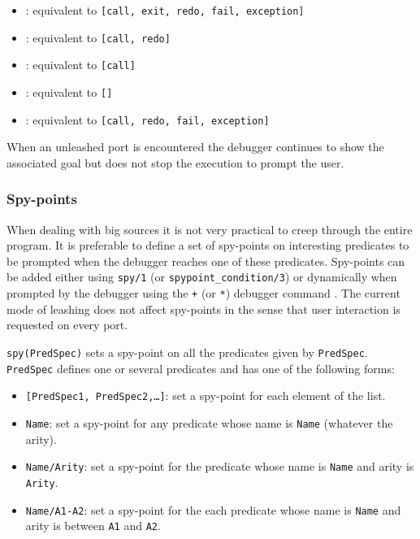 \begin{itemize}

\item {}: equivalent to \texttt{[call, exit, redo, fail,
exception]}

\item {}: equivalent to \texttt{[call, redo]}

\item {}: equivalent to \texttt{[call]}

\item {}: equivalent to \texttt{[]}

\item {}: equivalent to \texttt{[call, redo, fail,
exception]}

\end{itemize}

When an unleashed port is encountered the debugger continues to show the
associated goal but does not stop the execution to prompt the user.

\subsubsection{%
%
%
%
%
Spy-points \label{Spy-points}}

When dealing with big sources it is not very practical to creep through the
entire program. It is preferable to define a set of spy-points on
interesting predicates to be prompted when the debugger reaches one of these
predicates. Spy-points can be added either using \texttt{spy/1} (or
\texttt{spypoint\_condition/3}) or dynamically when prompted by the debugger
using the \texttt{+} (or \texttt{*}) debugger command
. The current mode of leashing does not
affect spy-points in the sense that user interaction is requested on
every port.

\texttt{spy(PredSpec)} sets a spy-point on all the predicates given by
\texttt{PredSpec}. \texttt{PredSpec} defines one or several predicates and
has one of the following forms:

\begin{itemize}

\item \texttt{[PredSpec1, PredSpec2,\ldots]}: set a spy-point for each
element of the list.

\item \texttt{Name}: set a spy-point for any predicate whose name is
\texttt{Name} (whatever the arity).

\item \texttt{Name/Arity}: set a spy-point for the predicate whose name is
\texttt{Name} and arity is \texttt{Arity}.

\item \texttt{Name/A1-A2}: set a spy-point for the each predicate whose name
is \texttt{Name} and arity is between \texttt{A1} and \texttt{A2}.

\end{itemize}

